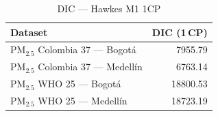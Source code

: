 \begin{table}[htbp]
\centering
\caption{DIC --- Hawkes M1 1CP}
\label{tab:hawkes_dic_1cp}
\begin{tabular}{lr}
\toprule
Dataset & DIC (1\,CP) \\
\midrule
PM$_{2.5}$ Colombia 37 --- Bogot\'{a} & 7955.79 \\
PM$_{2.5}$ Colombia 37 --- Medell\'{i}n & 6763.14 \\
PM$_{2.5}$ WHO 25 --- Bogot\'{a} & 18800.53 \\
PM$_{2.5}$ WHO 25 --- Medell\'{i}n & 18723.19 \\
\bottomrule
\end{tabular}
\end{table}
